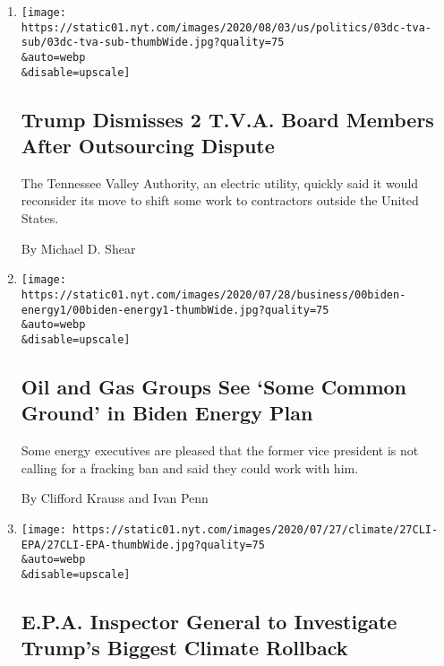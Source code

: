 \begin{enumerate}
\def\labelenumi{\arabic{enumi}.}
\item
  \href{/2020/08/03/us/politics/trump-tennessee-valley-authority.html}{}

  \texttt{[image: https://static01.nyt.com/images/2020/08/03/us/politics/03dc-tva-sub/03dc-tva-sub-thumbWide.jpg?quality=75\\\&auto=webp\\\&disable=upscale]}

  \hypertarget{trump-dismisses-2-tva-board-members-after-outsourcing-dispute}{%
  \subsection{Trump Dismisses 2 T.V.A. Board Members After Outsourcing
  Dispute}\label{trump-dismisses-2-tva-board-members-after-outsourcing-dispute}}

  The Tennessee Valley Authority, an electric utility, quickly said it
  would reconsider its move to shift some work to contractors outside
  the United States.

  By Michael D. Shear
\item
  \href{/2020/07/28/business/energy-environment/joe-biden-oil-gas-energy.html}{}

  \texttt{[image: https://static01.nyt.com/images/2020/07/28/business/00biden-energy1/00biden-energy1-thumbWide.jpg?quality=75\\\&auto=webp\\\&disable=upscale]}

  \hypertarget{oil-and-gas-groups-see-some-common-ground-in-biden-energy-plan}{%
  \subsection{Oil and Gas Groups See `Some Common Ground' in Biden
  Energy
  Plan}\label{oil-and-gas-groups-see-some-common-ground-in-biden-energy-plan}}

  Some energy executives are pleased that the former vice president is
  not calling for a fracking ban and said they could work with him.

  By Clifford Krauss and Ivan Penn
\item
  \href{/2020/07/27/climate/trump-fuel-efficiency-rule.html}{}

  \texttt{[image: https://static01.nyt.com/images/2020/07/27/climate/27CLI-EPA/27CLI-EPA-thumbWide.jpg?quality=75\\\&auto=webp\\\&disable=upscale]}

  \hypertarget{epa-inspector-general-to-investigate-trumps-biggest-climate-rollback}{%
  \subsection{E.P.A. Inspector General to Investigate Trump's Biggest
  Climate
  Rollback}\label{epa-inspector-general-to-investigate-trumps-biggest-climate-rollback}}


\end{enumerate}
